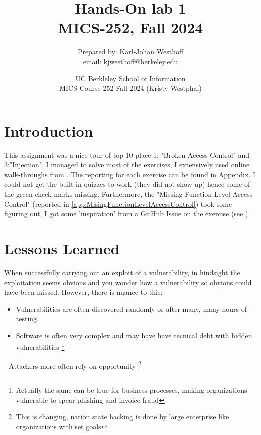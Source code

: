 \documentclass[
	letterpaper, %
	10pt, %
	unnumberedsections, %
	twoside, %
]{APAAssignment}
\title{Hands-On lab 1 \\ MICS-252, Fall 2024} %
\date{UC Berkleley School of Information \\
MICS Course 252 Fall 2024 (Kristy Westphal)
}
\author{
	Prepared by: Karl-Johan Westhoff \\
	email: \href{mailto:kjwesthoff@berkeley.edu}{kjwesthoff@berkeley.edu}
}
\begin{document}
\onecolumn
\maketitle %


\section{Introduction}
This assignment was a nice tour of top 10 place 1: "Broken Access Control" and 3:"Injection". I managed to solve most of the exercises, I extensively used online walk-throughs from \cite{CycubicsDocsWebGoat}. The reporting for each exercise can be found in Appendix. 
I could not get the built in quizzes to work (they did not show up) hence some of the green check-marks missing. Furthermore, the "Missing Function Level Access Control" (reported in \ref{app:MisingFunctionLevelAccessControl}) took some figuring out, I got some 'inspiration' from a GitHub Issue on the exercise (see \cite{WebGoatGitHubIssue1424}).


\section{Lessons Learned}
When successfully carrying out an exploit of a vulnerability, in hindsight the exploitation seems obvious and you wonder how a vulnerability so obvious could have been missed. However, there is nuance to this: 

\begin{itemize}
	\item{Vulnerabilities are often discovered randomly or after many, many hours of testing.}
	\item{Software is often very complex and may have have tecnical debt with hidden vulnerabilities \footnote{Actually the same can be true for business processes, making organizations vulnerable to spear phishing and invoice fraud}}
\end{itemize}

- Attackers more often rely on opportunity \footnote{This is changing, nation state hacking is done by large enterprise like organizations with set goals}
\end{document}
